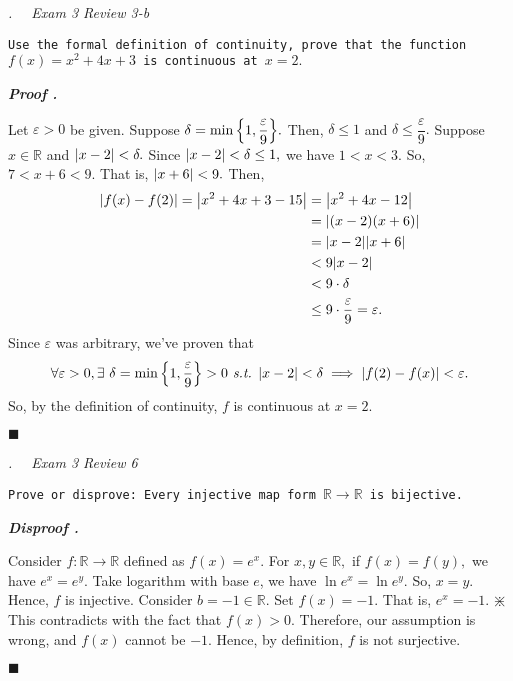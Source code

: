 \documentclass[11pt,letter]{article}
\newcounter{nq}[section]
\newcounter{np}[section]
\newenvironment*{p}{\par\noindent\textbf{\textit{Proof \stepcounter{np}\thenp. }}\par}{\par\hfill $\blacksquare$\par}
\newenvironment*{dis}{\par\noindent\textbf{\textit{Disproof \stepcounter{np}\thenp. }}\par}{\par\hfill $\blacksquare$\par}
\newenvironment*{q}[1]{\noindent\emph{\thesection.\stepcounter{nq}\thenq$\quad $ #1}\par\noindent\texttt}{}
\def\R{{\mathbb{R}}}
\def\epsilon{\varepsilon}
\def\st{\emph{ s.t. }}
\begin{document}
\begin{framed}\begin{q}
	{Exam 3 Review 3-b}
	{Use the formal definition of continuity, prove that the function $f(x)=x^2+4x+3$ is continuous at $x=2.$}
\end{q}\end{framed}
\begin{p}
	Let $\epsilon>0$ be given. Suppose $\delta=\min\qty{1,\dfrac{\epsilon}{9}}.$ Then, $\delta\leq1$ and $\delta\leq\dfrac{\epsilon}{9}.$ Suppose $x\in\R$ and $\qty|x-2|<\delta.$ Since $\qty|x-2|<\delta\leq1,$ we have $1<x<3.$ So, $7<x+6<9.$ That is, $\qty|x+6|<9.$ Then, \[\begin{aligned}\qty|f(x)-f(2)|=\qty|x^2+4x+3-15|&=\qty|x^2+4x-12|\\&=\qty|(x-2)(x+6)|\\&=\qty|x-2|\qty|x+6|\\&<9\qty|x-2|\\&<9\cdot\delta\\&\leq9\cdot\dfrac{\epsilon}{9}=\epsilon.\end{aligned}\] Since $\epsilon$ was arbitrary, we've proven that \[\forall\epsilon>0,\exists\ \delta=\min\qty{1,\dfrac{\epsilon}{9}}>0\st\qty|x-2|<\delta\implies\qty|f(2)-f(x)|<\epsilon.\] So, by the definition of continuity, $f$ is continuous at $x=2.$
\end{p}

\begin{framed}\begin{q}
	{Exam 3 Review 6}
	{Prove or disprove: Every injective map form $\R\to\R$ is bijective.}
\end{q}\end{framed}
\begin{dis}
	Consider $f:\R\to\R$ defined as $f(x)=e^x$.	For $x,y\in\R,$ if $f(x)=f(y),$ we have $e^x=e^y.$ Take logarithm with base $e$, we have $\ln e^x=\ln e^y.$ So, $x=y.$ Hence, $f$ is injective. Consider $b=-1\in\R.$ Set $f(x)=-1.$ That is, $e^x=-1.$ $\divideontimes$ This contradicts with the fact that $f(x)>0.$ Therefore, our assumption is wrong, and $f(x)$ cannot be $-1.$ Hence, by definition, $f$ is not surjective. 
\end{dis}
\end{document}
